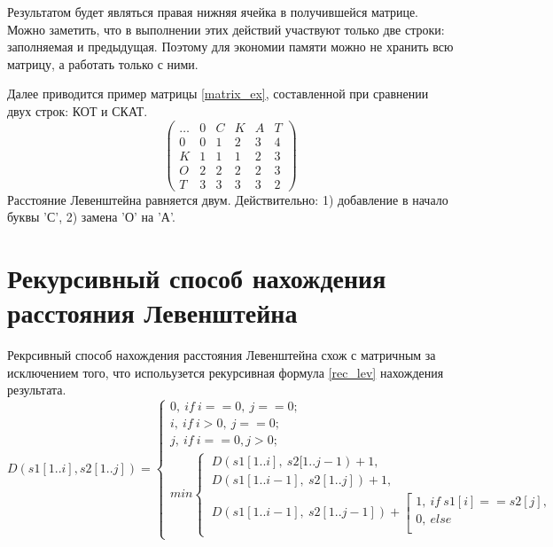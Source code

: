 Результатом будет являться правая нижняя ячейка в получившейся матрице. Можно заметить, что в выполнении этих действий участвуют только две строки: заполняемая и предыдущая. Поэтому для экономии памяти можно не хранить всю матрицу, а работать только с ними. 

Далее приводится пример матрицы \ref{matrix_ex}, составленной при сравнении двух строк: КОТ и СКАТ.
\begin{equation}
	\label{matrix_ex}
	\left(
	\begin{array}{cccccc}
		\ldots & 0 & C & K & A & T \\
		0 & 0 & 1 & 2 & 3 & 4 \\
	 	K & 1 & 1 & 1 & 2 & 3 \\
		O & 2 & 2 & 2 & 2 & 3 \\
		T & 3 & 3 & 3 & 3 & 2
	\end{array}
	\right)
\end{equation}
Расстояние Левенштейна равняется двум. Действительно: 1) добавление в начало буквы 'С', 2) замена 'О' на 'А'.

\section{Рекурсивный способ нахождения расстояния Левенштейна}
Рекрсивный способ нахождения расстояния Левенштейна схож с матричным за исключением того, что испольузется рекурсивная формула \ref{rec_lev} нахождения результата.
\begin{equation}
	\label{rec_lev}
	D(s1[1..i], s2[1..j]) = 
	\begin{cases}
		0,~if~i == 0,~j == 0; \\
		i,~if~i > 0,~j == 0; \\
		j,~if~i == 0, j > 0; \\
		min
		\begin{cases}
			~D(s1[1..i],~s2[1..j-1) + 1, \\
			~D(s1[1..i-1],~s2[1..j]) + 1, \\
			~D(s1[1..i-1],~s2[1..j-1]) + 
			\left[
			\begin{gathered}
				1,~if~s1[i] == s2[j], \\
				0,~else \\
			\end{gathered}
			\right.
		\end{cases}
	\end{cases}	
\end{equation}

